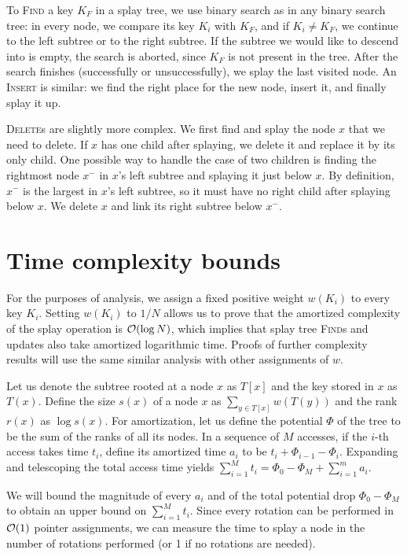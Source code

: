 
To \textsc{Find} a key $K_F$ in a splay tree, we use binary search as in any
binary search tree: in every node, we compare its key $K_i$ with $K_F$, and
if $K_i \neq K_F$, we continue to the left subtree or to the right subtree.
If the subtree we would like to descend into is empty, the search is aborted,
since $K_F$ is not present in the tree.
After the search finishes (successfully or unsuccessfully), we splay the last
visited node. An \textsc{Insert} is similar: we find the right place for the
new node, insert it, and finally splay it up.

\textsc{Delete}s are slightly more complex. We first find and splay the node $x$
that we need to delete. If $x$ has one child after splaying, we delete it and
replace it by its only child. One possible way to handle the case of two
children is finding the rightmost node $x^-$ in $x$'s left subtree and splaying
it just below $x$. By definition, $x^-$ is the largest in $x$'s left subtree,
so it must have no right child after splaying below $x$. We delete $x$ and link
its right subtree below $x^-$.

\section{Time complexity bounds}
For the purposes of analysis, we assign a fixed positive weight $w(K_i)$
to every key $K_i$. Setting $w(K_i)$ to $1/N$ allows us to prove that
the amortized complexity of the splay operation is $\mathcal{O}(\log N)$, which implies
that splay tree \textsc{Find}s and updates also take amortized logarithmic time.
Proofs of further complexity results will use the same similar analysis with
other assignments of $w$.

Let us denote the subtree rooted at a node $x$ as $T[x]$
and the key stored in $x$ as $T(x)$. Define the size $s(x)$ of a node $x$ as
$\sum_{y\in T[x]} w(T(y))$ and the rank $r(x)$ as $\log s(x)$.
For amortization, let us define the potential $\Phi$ of the tree to be the sum
of the ranks of all its nodes. In a sequence of $M$ accesses, if the $i$-th
access takes time $t_i$, define its amortized time $a_i$ to be
$t_i+\Phi_{i-1}-\Phi_{i}$. Expanding and telescoping the total access time
yields $\sum_{i=1}^M t_i=\Phi_0-\Phi_M+\sum_{i=1}^m a_i$.

We will bound the magnitude of every $a_i$ and of the total potential drop
$\Phi_0-\Phi_M$ to obtain an upper bound on $\sum_{i=1}^M t_i$.
Since every rotation can be performed in $\mathcal{O}(1)$
pointer assignments, we can measure the time to splay a node in the number
of rotations performed (or 1 if no rotations are needed).

